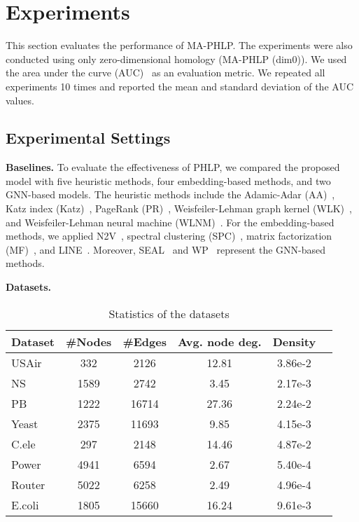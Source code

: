 \section{Experiments}
This section evaluates the performance of MA-PHLP. 
The experiments were also conducted using only zero-dimensional homology (MA-PHLP (dim$0$)).
We used the area under the curve (AUC)~\cite{bradley1997use} as an evaluation metric. We repeated all experiments 10 times and reported the mean and standard deviation of the AUC values. 

\subsection{Experimental Settings}

\noindent\textbf{Baselines.} To evaluate the effectiveness of PHLP, we compared the proposed model with five heuristic methods, four embedding-based methods, and two GNN-based models. The heuristic methods include the Adamic-Adar (AA)~\cite{adamic2003friends}, Katz index (Katz)~\cite{katz1953new}, PageRank (PR)~\cite{brin1998anatomy}, Weisfeiler-Lehman graph kernel (WLK)~\cite{shervashidze2011weisfeiler}, and Weisfeiler-Lehman neural machine (WLNM)~\cite{zhang2017weisfeiler}. 
For the embedding-based methods, we applied N2V~\cite{grover2016node2vec}, spectral clustering (SPC)~\cite{tang2011leveraging}, matrix factorization (MF)~\cite{koren2009matrix}, and LINE~\cite{tang2015line}. Moreover, SEAL~\cite{zhang2018link} and WP~\cite{pan2021neural} represent the GNN-based methods. 

\noindent\textbf{Datasets.}
\begin{table}[ht!]
\centering
\caption{Statistics of the datasets}
\begin{tabular}{l|ccccc}
\toprule
Dataset & \#Nodes & \#Edges & Avg. node deg. & Density \\
\midrule
{USAir} & 332 & 2126 & 12.81 & 3.86e-2 \\ 
{NS} & 1589 & 2742 & 3.45 & 2.17e-3 \\ 
{PB} & 1222 & 16714 & 27.36 & 2.24e-2 \\ 
{Yeast} & 2375 & 11693 & 9.85 & 4.15e-3 \\ 
{C.ele} & 297 & 2148 & 14.46 & 4.87e-2 \\ 
{Power} & 4941 & 6594 & 2.67 & 5.40e-4 \\ 
{Router} & 5022 & 6258 & 2.49 & 4.96e-4 \\ 
{E.coli} & 1805 & 15660 & 16.24 & 9.61e-3 \\ 
\bottomrule
\end{tabular}
\label{tbl:dataset}
\end{table}

